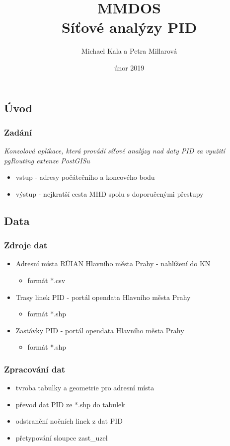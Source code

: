 \documentclass{beamer}
\title{MMDOS \\ Síťové analýzy PID}
\author{Michael Kala a Petra Millarová}
\date{únor 2019}
\begin{document}
\begin{frame}
\titlepage
\end{frame}

\begin{frame}
\section{Úvod}
\frametitle{Zadání}
\begin{block}{}
 \textit{Konzolová aplikace, která provádí síťové analýzy nad daty PID za využití pgRouting extenze PostGISu} 
 \end{block}
 
\begin{itemize}
	\item vstup - adresy počátečního a koncového bodu
	\item výstup - nejkratší cesta MHD spolu s doporučenými přestupy
\end{itemize}
\end{frame}

\begin{frame}
\section{Data}
\frametitle{Zdroje dat}
\begin{itemize}
	\item Adresní místa RÚIAN Hlavního města Prahy - nahlížení do KN
		\begin{itemize}
				\item formát *.csv
		\end{itemize}		 
	\item Trasy linek PID - portál opendata Hlavního města Prahy
		\begin{itemize}
			\item formát *.shp
		\end{itemize}
	\item Zastávky PID - portál opendata Hlavního města Prahy
		\begin{itemize}
			\item formát *.shp
		\end{itemize}
\end{itemize}
\end{frame}


\begin{frame}
\frametitle{Zpracování dat}
\begin{itemize}
	\item tvroba tabulky a geometrie pro adresní místa
	\item převod dat PID ze *.shp do tabulek
	\item odstranění nočních linek z dat PID
	\item přetypování sloupce zast\_uzel
\end{itemize}
\end{frame}
\end{document}
